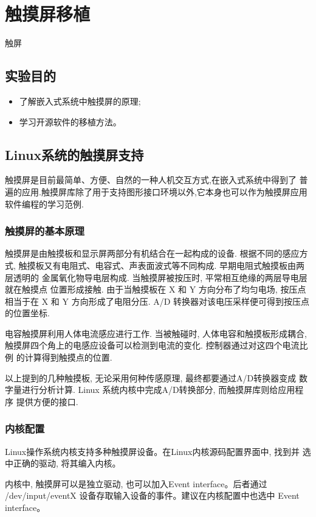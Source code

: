 \chapter{触摸屏移植}{触屏}\label{ch-ts}

\section{实验目的}
\begin{itemize}
    \item 了解嵌入式系统中触摸屏的原理;
    \item 学习开源软件的移植方法。
\end{itemize}

\section{Linux系统的触摸屏支持}
触摸屏是目前最简单、方便、自然的一种人机交互方式,在嵌入式系统中得到了
普遍的应用.触摸屏库除了用于支持图形接口环境以外,它本身也可以作为触摸屏应用
软件编程的学习范例.

\subsection{触摸屏的基本原理}
触摸屏是由触摸板和显示屏两部分有机结合在一起构成的设备. 根据不同的感应方式,
触摸板又有电阻式、电容式、声表面波式等不同构成. 早期电阻式触摸板由两层透明的
金属氧化物导电层构成. 当触摸屏被按压时, 平常相互绝缘的两层导电层就在触摸点
位置形成接触. 由于当触摸板在 X 和 Y 方向分布了均匀电场, 按压点相当于在 X 和
Y 方向形成了电阻分压. A/D 转换器对该电压采样便可得到按压点的位置坐标.

电容触摸屏利用人体电流感应进行工作. 当被触碰时, 人体电容和触摸板形成耦合,
触摸屏四个角上的电感应设备可以检测到电流的变化. 控制器通过对这四个电流比例
的计算得到触摸点的位置.

以上提到的几种触摸板, 无论采用何种传感原理, 最终都要通过A/D转换器变成
数字量进行分析计算. Linux 系统内核中完成A/D转换部分, 而触摸屏库则给应用程序
提供方便的接口.

\subsection{内核配置}
Linux操作系统内核支持多种触摸屏设备。在Linux内核源码配置界面中, 找到并
选中正确的驱动, 将其编入内核。

内核中, 触摸屏可以是独立驱动, 也可以加入Event interface。后者通过
/dev/input/eventX 设备存取输入设备的事件。建议在内核配置中也选中
Event interface。

